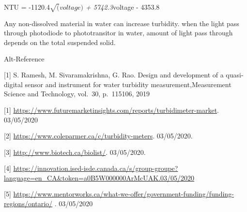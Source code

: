 \documentclass[]{article}
\begin{document}
NTU = -1120.4\emph{\(\sqrt(voltage)\) + 5742.3}voltage - 4353.8

Any non-dissolved material in water can increase turbidity. when the
light pass through photodiode to phototransitor in water, amount of
light pass through depends on the total suspended solid.

Alt-Reference

{[}1{]} S. Ramesh, M. Sivaramakrishna, G. Rao. Design and development of
a quasi-digital sensor and instrument for water turbidity
measurement,Measurement Science and Technology, vol.~30, p.~115106, 2019

{[}1{]}
\url{https://www.futuremarketinsights.com/reports/turbidimeter-market}.
03/05/2020

{[}2{]} \url{https://www.coleparmer.ca/c/turbidity-meters}. 03/05/2020.

{[}3{]} \url{http://www.biotech.ca/biolist/}. 03/05/2020.

{[}4{]}
\url{https://innovation.ised-isde.canada.ca/s/group-groupe?language=en_CA\&token=a0B5W000000ArMcUAK.03/05/2020}

{[}5{]}
\url{https://www.mentorworks.ca/what-we-offer/government-funding/funding-regions/ontario/}
. 03/05/2020
\end{document}
